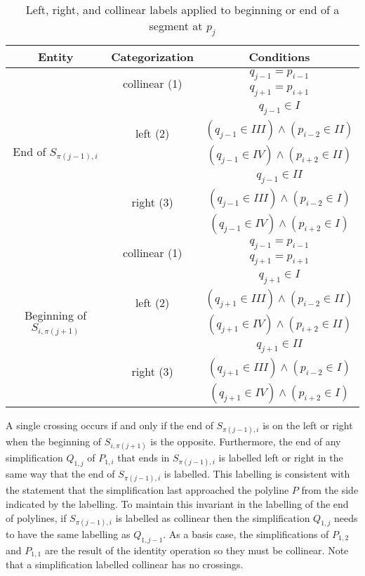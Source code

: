 \documentclass{article}
\begin{document}
\begin{table}
\begin{center}
\begin{tabular}{|c|c|c|}
\hline
Entity & Categorization & Conditions \\
\hline
\multirow{8}{*}{End of $S_{\pi(j-1),i}$} & \multirow{2}{*}{collinear (1)} & $q_{j-1} = p_{i-1}$ \\
&& $q_{j+1} = p_{i+1}$ \\ 
\cline{2-3}
& \multirow{3}{*}{left (2)} & $q_{j-1}\in I$ \\
& &  $(q_{j-1}\in III) \wedge (p_{i-2}\in II)$ \\
& &  $(q_{j-1}\in IV) \wedge (p_{i+2}\in II)$ \\
\cline{2-3}
& \multirow{3}{*}{right (3)} & $q_{j-1}\in II$ \\
& &  $(q_{j-1}\in III) \wedge (p_{i-2}\in I)$ \\
& &  $(q_{j-1}\in IV) \wedge (p_{i+2}\in I)$\\
\hline
\multirow{8}{*}{Beginning of $S_{i,\pi(j+1)}$} & \multirow{2}{*}{collinear (1)} & $q_{j-1} = p_{i-1}$ \\
&& $q_{j+1} = p_{i+1}$ \\ 
\cline{2-3}
& \multirow{3}{*}{left (2)} & $q_{j+1}\in I$ \\
& &  $(q_{j+1}\in III) \wedge (p_{i-2}\in II)$ \\
& &  $(q_{j+1}\in IV) \wedge (p_{i+2}\in II)$ \\
\cline{2-3}
& \multirow{3}{*}{right (3)} & $q_{j+1}\in II$ \\
& &  $(q_{j+1}\in III) \wedge (p_{i-2}\in I)$ \\
& &  $(q_{j+1}\in IV) \wedge (p_{i+2}\in I)$\\
\hline
\end{tabular}
\caption{Left, right, and collinear labels applied to beginning or end of a segment at $p_j$}
\label{tab:leftright}
\end{center}
\end{table}

A single crossing occurs if and only if the end of $S_{\pi(j-1),i}$ is on
the left or right when the beginning of $S_{i,\pi(j+1)}$ is the opposite. 
Furthermore, the end of any simplification $Q_{1,j}$ of $P_{1,i}$ that ends
in $S_{\pi(j-1),i}$ is labelled left or right in the same way that the end
of $S_{\pi(j-1),i}$ is labelled.  This labelling is consistent with the
statement that the simplification last approached the polyline $P$ from the
side indicated by the labelling.  To maintain this invariant in the
labelling of the end of polylines, if $S_{\pi(j-1),i}$ is labelled as
collinear then the simplification $Q_{1,j}$ needs to have the same labelling
as $Q_{1,j-1}$.  As a basis case, the simplifications of $P_{1,2}$ and
$P_{1,1}$ are the result of the identity operation so they must be
collinear.  Note that a simplification labelled collinear
has no crossings.
\end{document}
